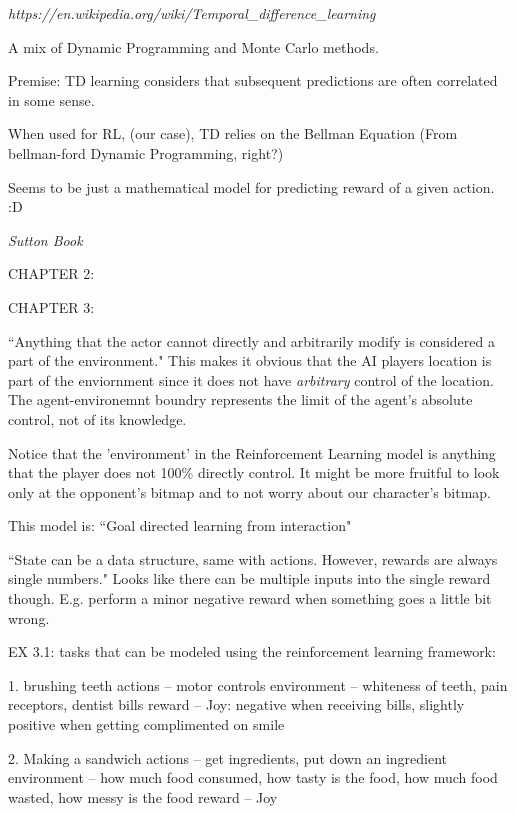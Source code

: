 \textit{https://en.wikipedia.org/wiki/Temporal_difference_learning}

A mix of Dynamic Programming and Monte Carlo methods.

Premise: TD learning considers that subsequent predictions are often correlated in some sense.

When used for RL, (our case), TD relies on the Bellman Equation (From bellman-ford Dynamic Programming, right?)

Seems to be just a mathematical model for predicting reward of a given action. :D


\textit{Sutton Book}

CHAPTER 2:



CHAPTER 3:

``Anything that the actor cannot directly and arbitrarily modify is considered a part of the environment."
This makes it obvious that the AI players location is part of the enviornment since it does not have \textit{arbitrary} control of the location.
The agent-environemnt boundry represents the limit of the agent's absolute control, not of its knowledge.

Notice that the 'environment' in the Reinforcement Learning model is anything that the player does not 100\% directly control.
It might be more fruitful to look only at the opponent's bitmap and to not worry about our character's bitmap.

This model is: ``Goal directed learning from interaction"

``State can be a data structure, same with actions. However, rewards are always single numbers."
Looks like there can be multiple inputs into the single reward though.
E.g. perform a minor negative reward when something goes a little bit wrong.

EX 3.1:
tasks that can be modeled using the reinforcement learning framework:

1. brushing teeth
actions -- motor controls
environment -- whiteness of teeth, pain receptors, dentist bills
reward -- Joy: negative when receiving bills, slightly positive when getting complimented on smile

2. Making a sandwich
actions -- get ingredients, put down an ingredient
environment -- how much food consumed, how tasty is the food, how much food wasted, how messy is the food
reward -- Joy

